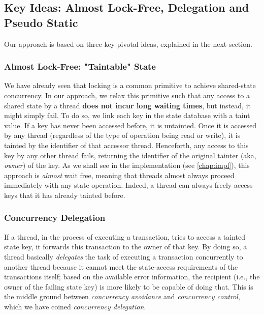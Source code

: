 \subsection{Key Ideas: Almost Lock-Free, Delegation and Pseudo Static}

Our approach is based on three key pivotal ideas, explained
in the next section.

\subsubsection{Almost Lock-Free: "Taintable" State}\label{chapt_approach:subsubsec:taintable_state}

We have already seen that locking is a common primitive to achieve shared-state concurrency. In our
approach, we relax this primitive such that any access to a shared state by a thread \textbf{does
not incur long waiting times}, but instead, it might simply fail. To do so, we link each key in the
state database with a taint value. If a key has never been accessed before, it is untainted. Once it
is accessed by any thread (regardless of the type of operation being read or write), it is tainted by the identifier of that
accessor thread. Henceforth, any access to this key by any other thread fails, returning the
identifier of the original tainter (aka, \textit{owner}) of the key. As we shall see in the
implementation (see \ref{chap:impl}), this approach is \textit{almost} wait free, meaning that
threads almost always proceed immediately with any state operation. Indeed, a thread can always
freely access keys that it has already tainted before.

\subsubsection{Concurrency Delegation}

If a thread, in the process of executing a transaction, tries to access a tainted state key, it
forwards this transaction to the owner of that key. By doing so, a thread basically
\textit{delegates} the task of executing a transaction concurrently to another thread
because it cannot meet the state-access requirements of the transactions itself; based on the
available error information, the recipient (i.e., the owner of the failing state key) is more likely
to be capable of doing that. This is the middle ground between \textit{concurrency avoidance} and
\textit{concurrency control}, which we have coined \textit{concurrency delegation}.


